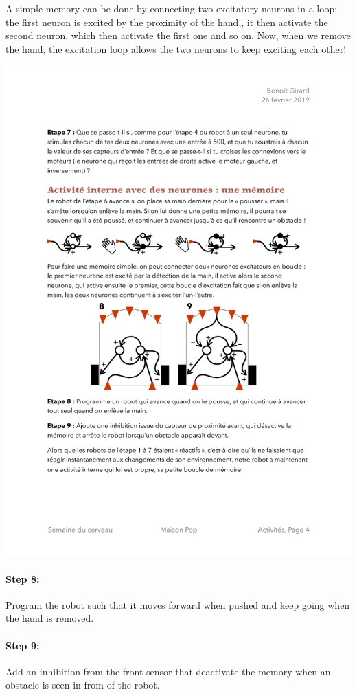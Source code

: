 \documentclass[12pt]{article}
\begin{document}
A simple memory can be done by connecting two excitatory neurons in a loop: the first neuron is excited by the proximity of the hand,, it then activate the second neuron, which then activate the first one and so on. Now, when we remove the hand, the excitation loop allows the two neurons to keep exciting each other!

\includegraphics{../Etapes8-9.pdf}

\paragraph{Step 8:} Program the robot such that it moves forward when pushed and keep going when the hand is removed.

\paragraph{Step 9:} Add an inhibition from the front sensor that deactivate the memory when an obstacle is seen in from of the robot.
\end{document}
